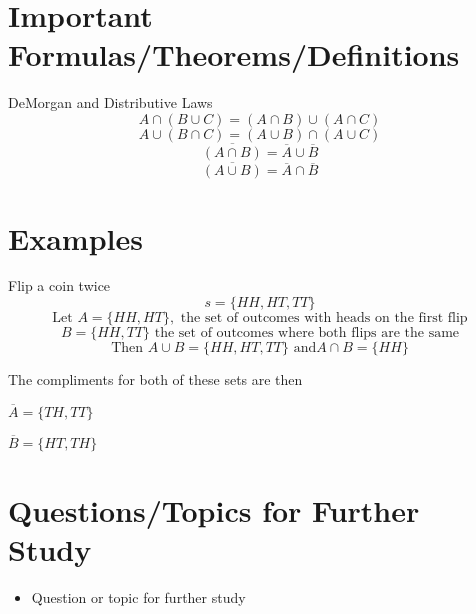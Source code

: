 \documentclass[12pt,a4paper]{article}
\begin{document}
\section{Important Formulas/Theorems/Definitions}
\begin{tcolorbox}[colback=blue!5!white,colframe=blue!75!black,title=Key Formula/Theorem]
  DeMorgan and Distributive Laws 
  \begin{equation}
    A \cap (B \cup C) = (A \cap B) \cup (A \cap C) 
  \end{equation}
  \begin{equation}
    A \cup (B \cap C) = (A \cup B) \cap (A \cup C)
  \end{equation}
  \begin{equation}
    \overline{(A \cap B)} = \overline{A} \cup \overline{B}
  \end{equation}
  \begin{equation}
    \overline{(A \cup B)} = \overline{A} \cap \overline{B}
  \end{equation}
\end{tcolorbox}

\section{Examples}
\begin{tcolorbox}
  Flip a coin twice 
  \begin{equation}
    s = \{ HH, HT, TT\}
  \end{equation}
  \begin{equation}
    \text{Let } A = \{HH, HT\}, \text{ the set of outcomes with heads on the first flip}
  \end{equation}
  \begin{equation}
  B = \{ HH, TT\} \text{ the set of outcomes where both flips are the same}  
  \end{equation}
  \begin{equation}
    \text{Then } A \cup B = \{HH, HT, TT\} \text{ and} A \cap B = \{HH\}  
  \end{equation}

  The compliments for both of these sets are then \\ 
  \vspace{4pt}

  \centerline{\( \overline{A} = \{TH, TT\}  \)}
  \centerline{\( \overline{B} = \{HT, TH \}  \)}
\end{tcolorbox}

\section{Questions/Topics for Further Study}
\begin{itemize}
  \item Question or topic for further study
\end{itemize}
\end{document}
